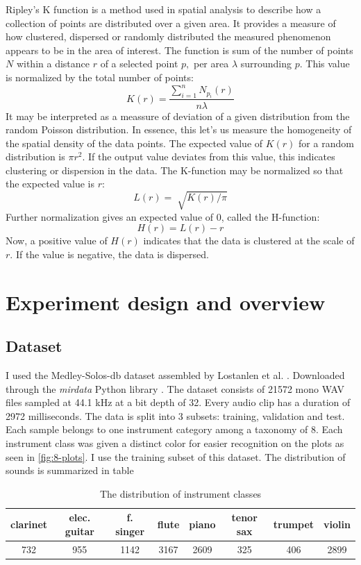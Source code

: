 \documentclass[a4paper, 12pt, twoside]{report}
\begin{document}
Ripley's K function is a method used in spatial analysis to describe how a collection of points are distributed over a given area. It provides a measure of how clustered, dispersed or randomly distributed the measured phenomenon appears to be in the area of interest. The function is sum of the number of points $N$ within a distance $r$ of a selected point $p,$ per area \(\lambda\) surrounding $p.$ This value is normalized by the total number of points:
\[K(r) = \frac{\sum_{i=1}^{n}N_{p_{i}}(r)}{n \lambda}\]
It may be interpreted as a meassure of deviation of a given distribution from the random Poisson distribution. In essence, this let's us measure the homogeneity of the spatial density of the data points. The expected value of \(K(r)\) for a random distribution is \(\pi r^{2}\). If the output value deviates from this value, this indicates clustering or dispersion in the data. The K-function may be normalized so that the expected value is $r$:
\[L(r) = \sqrt[]{K(r)/\pi}\]
Further normalization gives an expected value of 0, called the H-function:
\[H(r) = L(r) - r\]
Now, a positive value of \(H(r)\) indicates that the data is clustered at the scale of $r$. If the value is negative, the data is dispersed.

\newpage

\chapter{Experiment design and overview}
\label{sec:orga220b5b}
\section{Dataset}
\label{sec:orgac308b8}

I used the Medley-Solos-db dataset assembled by Lostanlen et al. \cite{medley}. Downloaded through the \textit{ mirdata } Python library \cite{bittner_fuentes_2019}. The dataset consists of 21572 mono WAV files sampled at 44.1 kHz at a bit depth of 32. Every audio clip has a duration of 2972 milliseconds. The data is split into 3 subsets: training, validation and test. Each sample belongs to one instrument category among a taxonomy of 8. Each instrument class was given a distinct color for easier recognition on the plots as seen in \ref{fig:8-plots}. I use the training subset of this dataset. The distribution of sounds is summarized in table \

\begin{table}[h!]
\centering
\begin{tabular}{ |c|c|c|c|c|c|c|c| }
\hline
clarinet & elec. guitar & f. singer & flute & piano & tenor sax & trumpet & violin \\
\hline
732 & 955 & 1142 & 3167 & 2609 & 325 & 406 & 2899 \\
\hline
\end{tabular}
\caption{\label{table:distr_of_sounds}The distribution of instrument classes}
\end{table}
\end{document}
